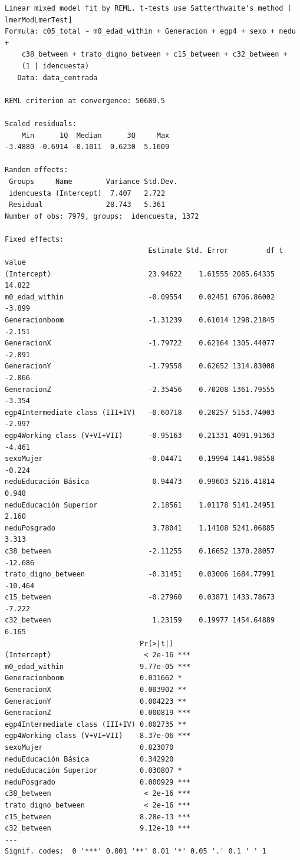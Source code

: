 \documentclass[
  spanish,
  a4paper,
  oneside]{scrbook}
\begin{document}
\begin{verbatim}
Linear mixed model fit by REML. t-tests use Satterthwaite's method [
lmerModLmerTest]
Formula: c05_total ~ m0_edad_within + Generacion + egp4 + sexo + nedu +  
    c38_between + trato_digno_between + c15_between + c32_between +  
    (1 | idencuesta)
   Data: data_centrada

REML criterion at convergence: 50689.5

Scaled residuals: 
    Min      1Q  Median      3Q     Max 
-3.4880 -0.6914 -0.1011  0.6230  5.1609 

Random effects:
 Groups     Name        Variance Std.Dev.
 idencuesta (Intercept)  7.407   2.722   
 Residual               28.743   5.361   
Number of obs: 7979, groups:  idencuesta, 1372

Fixed effects:
                                  Estimate Std. Error         df t value
(Intercept)                       23.94622    1.61555 2085.64335  14.822
m0_edad_within                    -0.09554    0.02451 6706.86002  -3.899
Generacionboom                    -1.31239    0.61014 1298.21845  -2.151
GeneracionX                       -1.79722    0.62164 1305.44077  -2.891
GeneracionY                       -1.79558    0.62652 1314.83008  -2.866
GeneracionZ                       -2.35456    0.70208 1361.79555  -3.354
egp4Intermediate class (III+IV)   -0.60718    0.20257 5153.74003  -2.997
egp4Working class (V+VI+VII)      -0.95163    0.21331 4091.91363  -4.461
sexoMujer                         -0.04471    0.19994 1441.98558  -0.224
neduEducación Básica               0.94473    0.99603 5216.41814   0.948
neduEducación Superior             2.18561    1.01178 5141.24951   2.160
neduPosgrado                       3.78041    1.14108 5241.06885   3.313
c38_between                       -2.11255    0.16652 1370.28057 -12.686
trato_digno_between               -0.31451    0.03006 1684.77991 -10.464
c15_between                       -0.27960    0.03871 1433.78673  -7.222
c32_between                        1.23159    0.19977 1454.64889   6.165
                                Pr(>|t|)    
(Intercept)                      < 2e-16 ***
m0_edad_within                  9.77e-05 ***
Generacionboom                  0.031662 *  
GeneracionX                     0.003902 ** 
GeneracionY                     0.004223 ** 
GeneracionZ                     0.000819 ***
egp4Intermediate class (III+IV) 0.002735 ** 
egp4Working class (V+VI+VII)    8.37e-06 ***
sexoMujer                       0.823070    
neduEducación Básica            0.342920    
neduEducación Superior          0.030807 *  
neduPosgrado                    0.000929 ***
c38_between                      < 2e-16 ***
trato_digno_between              < 2e-16 ***
c15_between                     8.28e-13 ***
c32_between                     9.12e-10 ***
---
Signif. codes:  0 '***' 0.001 '**' 0.01 '*' 0.05 '.' 0.1 ' ' 1
\end{verbatim}
\end{document}
